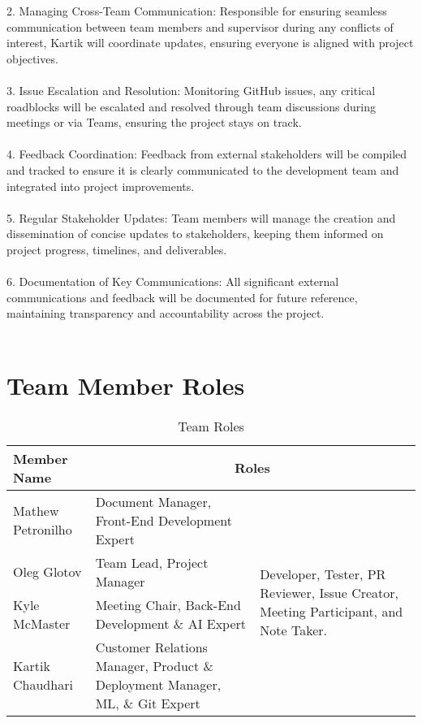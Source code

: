 \documentclass{article}
\begin{document}
2.	Managing Cross-Team Communication: Responsible for ensuring seamless communication between team members and supervisor during any conflicts of interest, Kartik will coordinate updates, ensuring everyone is aligned with project objectives. \\
\\

3.	Issue Escalation and Resolution: Monitoring GitHub issues, any critical roadblocks will be escalated and resolved through team discussions during meetings or via Teams, ensuring the project stays on track.\\
\\

4.	Feedback Coordination: Feedback from external stakeholders will be compiled and tracked to ensure it is clearly communicated to the development team and integrated into project improvements.\\
\\

5.	Regular Stakeholder Updates: Team members will manage the creation and dissemination of concise updates to stakeholders, keeping them informed on project progress, timelines, and deliverables. \\
\\

6.	Documentation of Key Communications: All significant external communications and feedback will be documented for future reference, maintaining transparency and accountability across the project.\\
\\





\section{Team Member Roles}
\begin{table}[H]
  \centering
  \begin{tabular}{|p{3cm}|p{6cm}|p{3cm}|}
    \hline
    \textbf{Member Name} & \multicolumn{2}{c|}{\textbf{Roles}} \\
    \hline
    Mathew Petronilho  & Document Manager, Front-End Development Expert & \multirow{4}{*}{\parbox{3cm}{Developer, Tester, PR Reviewer, Issue Creator, Meeting Participant, and Note Taker.}}\\
    \cline{1-2} 
    Oleg Glotov & Team Lead, Project Manager & \\
    \cline{1-2} 
    Kyle McMaster & Meeting Chair, Back-End Development \& AI Expert  & \\
    \cline{1-2}
    Kartik Chaudhari & Customer Relations Manager, Product \& Deployment Manager, ML, \& Git Expert & \\
    \hline
  \end{tabular}
  \caption{Team Roles}
\end{table}
\end{document}
